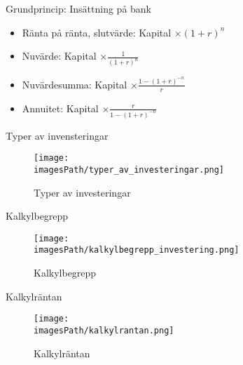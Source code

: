 Grundprincip: Insättning på bank
\begin{itemize}
    \item Ränta på ränta, slutvärde: Kapital $\times (1+r)^n$
    \item Nuvärde: Kapital $\times \frac{1}{(1+r)^n}$
    \item Nuvärdesumma: Kapital $\times \frac{1-(1+r)^{-n}}{r}$
    \item Annuitet: Kapital $\times \frac{r}{1-(1+r)^{-n}}$
\end{itemize}

Typer av invensteringar
\begin{figure}[!h]
    \centering
    \texttt{[image: \\imagesPath/typer\_av\_investeringar.png]}
    \caption{Typer av investeringar}
\end{figure}

Kalkylbegrepp
\begin{figure}[!h]
    \centering
    \texttt{[image: \\imagesPath/kalkylbegrepp\_investering.png]}
    \caption{Kalkylbegrepp}
\end{figure}

Kalkylräntan
\begin{figure}[!h]
    \centering
    \texttt{[image: \\imagesPath/kalkylrantan.png]}
    \caption{Kalkylräntan}
\end{figure}

